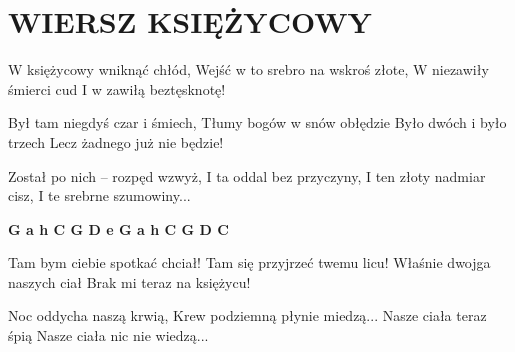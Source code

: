 \documentclass[../../../songbook.tex]{subfiles}
\begin{document}
\TabPositions{8cm} %
\section*{WIERSZ KSIĘŻYCOWY}
\vspace{0.5cm}
W księżycowy wniknąć chłód, 		 \newline 
Wejść w to srebro na wskroś złote, 	 \newline 
W niezawiły śmierci cud 			 \newline 
I w zawiłą beztęsknotę! 			 \newline 

Był tam niegdyś czar i śmiech,	\newline 
Tłumy bogów w snów obłędzie		\newline 
Było dwóch i było trzech		\newline 
Lecz żadnego już nie będzie!	\newline 

Został po nich – rozpęd wzwyż,	 \newline 
I ta oddal bez przyczyny,		 \newline 
I ten złoty nadmiar cisz,		 \newline 
I te srebrne szumowiny...		 \newline 

{\color{red}\textbf{G a h C G D e G a h C G D C} } \newline

Tam bym ciebie spotkać chciał!		\newline 
Tam się przyjrzeć twemu licu!		\newline 
Właśnie dwojga naszych ciał		\newline 
Brak mi teraz na księżycu!		\newline 

Noc oddycha naszą krwią,		\newline 
Krew podziemną płynie miedzą...	\newline 
Nasze ciała teraz śpią 			\newline 
Nasze ciała nic nie wiedzą...	\newline 
\end{document}
